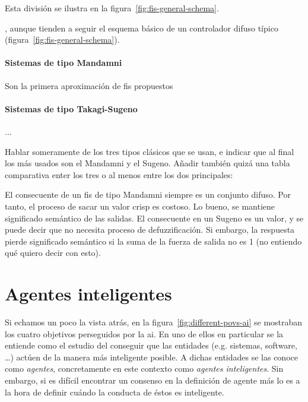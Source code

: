 Esta división se ilustra en la figura~\ref{fig:fis-general-schema}.

, aunque tienden a seguir el esquema básico de un controlador difuso típico (figura~\ref{fig:fis-general-schema}).

\paragraph{Sistemas de tipo Mandamni}

Son la primera aproximación de \gls{fis} propuestos

\paragraph{Sistemas de tipo Takagi-Sugeno}

...

Hablar someramente de los tres tipos clásicos que se usan, e indicar que al final los más usados son el Mandamni y el Sugeno. Añadir también quizá una tabla comparativa enter los tres o al menos entre los dos principales:

El consecuente de un \ac{fis} de tipo Mandamni siempre es un conjunto difuso. Por tanto, el proceso de sacar un valor crisp es costoso. Lo bueno, se mantiene significado semántico de las salidas. El consecuente en un Sugeno es un valor, y se puede decir que no necesita proceso de defuzzificación. Si embargo, la respuesta pierde significado semántico si la suma de la fuerza de salida no es 1 (no entiendo qué quiero decir con esto).

\section{Agentes inteligentes}
\label{ch:ci:s:agent-concept}

Si echamos un poco la vista atrás, en la figura~\ref{fig:different-povs-ai} se mostraban los cuatro objetivos perseguidos por la \ac{ai}. En uno de ellos en particular se la entiende como el estudio del conseguir que las entidades (e.g. sistemas, software, \ldots) actúen de la manera más inteligente posible. A dichas entidades se las conoce como \textit{agentes}, concretamente en este contexto como \textit{agentes inteligentes}. Sin embargo, si es difícil encontrar un consenso en la definición de agente más lo es a la hora de definir cuándo la conducta de éstos es inteligente.

